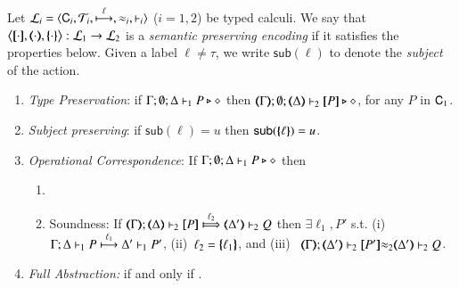 \smallskip 

\begin{definition}\rm
\label{def:ep}
       Let  $\tyl{L}_i=\calc{\CAL_i}{{\cal{T}}_i}{\hby{\ell}}{\wb_i}{\proves_i}$
       ($i=1,2$) be typed calculi. 
We say that $\enco{\map{\cdot}, \mapt{\cdot}, \mapa{\cdot}}: \tyl{L}_1 \to \tyl{L}_2$ is a \emph{semantic preserving encoding}
if it satisfies the properties below.
Given a label $\ell \neq \tau$, we write 
$\mathsf{sub}(\ell)$
to denote the \emph{subject} of the action.
	
	\begin{enumerate}[1.]
		\item \emph{Type Preservation}:
	if
	$\Gamma; \emptyset; \Delta \proves_1 P \hastype \Proc$ then 
	$\mapt{\Gamma}; \emptyset; \mapt{\Delta} \proves_2 \map{P} \hastype \Proc$,  
	for any   $P$ in $\CAL_1$.
			\item \emph{Subject preserving}: if $\mathsf{sub}(\ell) = u$ then $\mathsf{sub}(\mapa{\ell}) =u$.


	\item \emph{Operational Correspondence}: If $\Gamma; \emptyset; \Delta \proves_1 P \hastype \Proc$ then
		\begin{enumerate}
			\item	{}
				
			\item	Soundness:   
				If  $\wtytraarg{\mapt{\Gamma}}{\ell_2}{\mapt{\Delta}}{\map{P}}{\mapt{\Delta'}}{Q}{2}$
				then $\exists \ell_1, P'$ s.t.  
				(i)~$\stytraarg{\Gamma}{\ell_1}{\Delta}{P}{\Delta'}{P'}{1}$,
				(ii)~$\ell_2 = \mapa{\ell_1}$, and
				(iii)~
${\mapt{\Gamma}};{\mapt{\Delta'}}\proves_2 {\map{P'}}{\wb_2}
{\mapt{\Delta'}}\proves_2 {Q}$.

		\end{enumerate}
		
		\item \emph{Full Abstraction:} 
		if and only if
		.
		
	\end{enumerate}
\end{definition}

